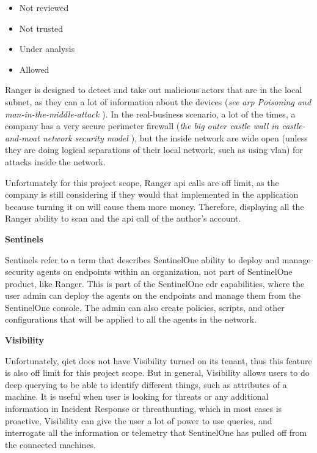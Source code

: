 \begin{itemize}
      \item Not reviewed
      \item Not trusted
      \item Under analysis
      \item Allowed
\end{itemize}

Ranger is designed to detect and take out malicious actors that are in the local subnet, as they can a lot of information about the
devices (\textit{see \acrshort{arp} Poisoning \cite{arpSpoofing} and man-in-the-middle-attack \cite{man-in-the-middleAttack}}).
In the real-business scenario, a lot of the times, a company has a very secure perimeter firewall
(\textit{the big outer castle wall in castle-and-moat network security model \cite{castleMoatWallNetwork}}), but the inside network
are wide open (unless they are doing logical separations of their local network, such as using \acrshort{vlan}) for attacks inside
the network.

Unfortunately for this project scope, Ranger \acrshort{api} calls are off limit, as the company is still considering if they would
that implemented in the application because turning it on will cause them more money. Therefore, displaying all the Ranger ability
to scan and the \acrshort{api} call of the author's account.

\textbf{Sentinels}

Sentinels refer to a term that describes SentinelOne ability to deploy and manage security agents on endpoints within an
organization, not part of SentinelOne product, like Ranger. This is part of the SentinelOne \acrshort{edr} capabilities,
where the user admin can deploy the agents on the endpoints and manage them from the SentinelOne console. The admin can
also create policies, scripts, and other configurations that will be applied to all the agents in the network.

\textbf{Visibility}

Unfortunately, \acrshort{qict} does not have Visibility turned on its tenant, thus this feature is also off limit for this project
scope. But in general, Visibility allows users to do deep querying to be able to identify different things, such as attributes of
a machine. It is useful when user is looking for threats or any additional information in Incident Response or \gls{threathunting},
which in most cases is proactive, Visibility can give the user a lot of power to use queries, and interrogate all the information
or telemetry that SentinelOne has pulled off from the connected machines.

